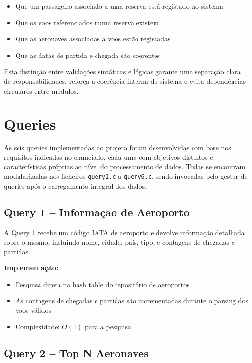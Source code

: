 \documentclass[a4paper,12pt]{scrreprt}
\begin{document}
\begin{itemize}
    \item Que um passageiro associado a uma reserva está registado no sistema
    \item Que os voos referenciados numa reserva existem
    \item Que as aeronaves associadas a voos estão registadas
    \item Que as datas de partida e chegada são coerentes
\end{itemize}

Esta distinção entre validações sintáticas e lógicas garante uma separação clara de responsabilidades, reforça a coerência interna do sistema e evita dependências circulares entre módulos.


\section{Queries}

As seis queries implementadas no projeto foram desenvolvidas com base nos requisitos indicados no enunciado, cada uma com objetivos distintos e características próprias ao nível do processamento de dados. Todas se encontram modularizadas nos ficheiros \texttt{query1.c} a \texttt{query6.c}, sendo invocadas pelo gestor de queries após o carregamento integral dos dados.

\subsection{Query 1 -- Informação de Aeroporto}

A Query 1 recebe um código IATA de aeroporto e devolve informação detalhada sobre o mesmo, incluindo nome, cidade, país, tipo, e contagens de chegadas e partidas.

\textbf{Implementação:}
\begin{itemize}
    \item Pesquisa direta na hash table do repositório de aeroportos
    \item As contagens de chegadas e partidas são incrementadas durante o parsing dos voos válidos
    \item Complexidade: $O(1)$ para a pesquisa
\end{itemize}

\subsection{Query 2 -- Top N Aeronaves}
\end{document}
